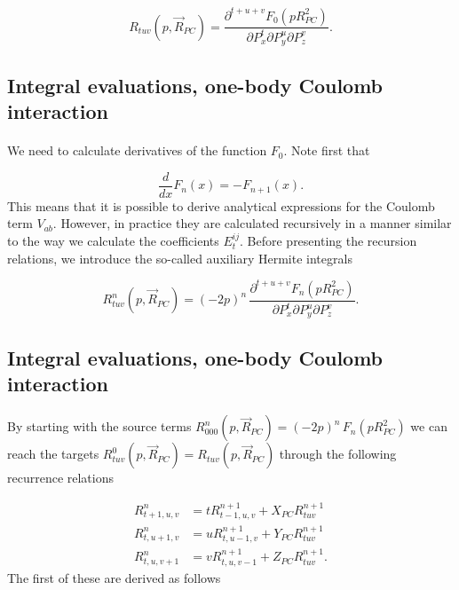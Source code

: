 \documentclass[%
twoside,                 %
final,                   %
10pt]{article}
\begin{document}
\begin{equation}
 R_{tuv}(p,\vec R_{PC}) = \frac{\partial^{t+u+v} F_0(p R^2_{PC})}{\partial P_x^t \partial P_y^u \partial P_z^v}.
\end{equation}




\subsection{Integral evaluations, one-body Coulomb interaction}

\paragraph{}

We need to calculate derivatives of the function $F_0$. Note first that

\begin{equation}
 \frac{d}{dx}F_n(x) = -F_{n+1}(x).
\end{equation}
This means that it is possible to derive analytical expressions for the Coulomb term $V_{ab}$. However, in practice they are calculated recursively in a manner similar to the way we calculate
the coefficients $E^{ij}_t$. Before presenting the recursion relations, we introduce the so-called auxiliary Hermite integrals

\begin{equation}
 R^n_{tuv}(p,\vec R_{PC}) = (-2p)^n\,\frac{\partial^{t+u+v} F_n(p R^2_{PC})}{\partial P_x^t \partial P_y^u \partial P_z^v}.
\end{equation}



\subsection{Integral evaluations, one-body Coulomb interaction}

\paragraph{}

By starting with the source terms $R^n_{000}(p,\vec R_{PC}) = (-2p)^n\,F_n(p R^2_{PC})$ we can reach the targets $R^0_{tuv}(p,\vec R_{PC}) = R_{tuv}(p,\vec R_{PC})$ through the following
recurrence relations

\begin{equation}
\label{eq:R_recurrence}
 \begin{split}
  R^n_{t+1,u,v} & = tR^{n+1}_{t-1,u,v} + X_{PC} R^{n+1}_{tuv} \\
  R^n_{t,u+1,v} & = uR^{n+1}_{t,u-1,v} + Y_{PC} R^{n+1}_{tuv} \\
  R^n_{t,u,v+1} & = vR^{n+1}_{t,u,v-1} + Z_{PC} R^{n+1}_{tuv}.
 \end{split}
\end{equation}
The first of these are derived as follows
\end{document}
